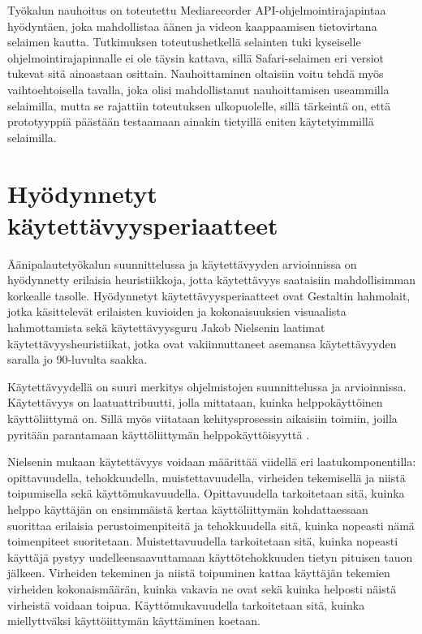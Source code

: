 \documentclass[utf8]{gradu3}
\begin{document}
Työkalun nauhoitus on toteutettu Mediarecorder API-ohjelmointirajapintaa hyödyntäen, joka mahdollistaa äänen ja videon kaappaamisen tietovirtana selaimen kautta. Tutkimuksen toteutushetkellä selainten tuki kyseiselle ohjelmointirajapinnalle ei ole täysin kattava, sillä Safari-selaimen eri versiot tukevat sitä ainoastaan osittain. Nauhoittaminen oltaisiin voitu tehdä myös vaihtoehtoisella tavalla, joka olisi mahdollistanut nauhoittamisen useammilla selaimilla, mutta se rajattiin toteutuksen ulkopuolelle, sillä tärkeintä on, että prototyyppiä päästään testaamaan ainakin tietyillä eniten käytetyimmillä selaimilla.

\section{Hyödynnetyt käytettävyysperiaatteet}
\label{Kaytettavyysperiaatteet}


Äänipalautetyökalun suunnittelussa ja käytettävyyden arvioinnissa on hyödynnetty erilaisia heuristiikkoja, jotta käytettävyys saataisiin mahdollisimman korkealle tasolle. Hyödynnetyt käytettävyysperiaatteet ovat Gestaltin hahmolait, jotka käsittelevät erilaisten kuvioiden ja kokonaisuuksien visuaalista hahmottamista sekä käytettävyysguru Jakob Nielsenin laatimat käytettävyysheuristiikat, jotka ovat vakiinnuttaneet asemansa käytettävyyden saralla jo 90-luvulta saakka.

Käytettävyydellä on suuri merkitys ohjelmistojen suunnittelussa ja arvioinnissa. Käytettävyys on laatuattribuutti, jolla mittataan, kuinka helppokäyttöinen käyttöliittymä on. Sillä myös viitataan kehitysprosessin aikaisiin toimiin, joilla pyritään parantamaan käyttöliittymän helppokäyttöisyyttä \parencite[][]{intro-usability}.

Nielsenin \parencite[][]{intro-usability} mukaan käytettävyys voidaan määrittää viidellä eri laatukomponentilla: opittavuudella, tehokkuudella, muistettavuudella, virheiden tekemisellä ja niistä toipumisella sekä käyttömukavuudella. Opittavuudella tarkoitetaan sitä, kuinka helppo käyttäjän on ensimmäistä kertaa käyttöliittymän kohdattaessaan suorittaa erilaisia perustoimenpiteitä ja tehokkuudella sitä, kuinka nopeasti nämä toimenpiteet suoritetaan. Muistettavuudella tarkoitetaan sitä, kuinka nopeasti käyttäjä pystyy uudelleensaavuttamaan käyttötehokkuuden tietyn pituisen tauon jälkeen. Virheiden tekeminen ja niistä toipuminen kattaa käyttäjän tekemien virheiden kokonaismäärän, kuinka vakavia ne ovat sekä kuinka helposti näistä virheistä voidaan toipua. Käyttömukavuudella tarkoitetaan sitä, kuinka miellyttväksi käyttöiittymän käyttäminen koetaan.
\end{document}

